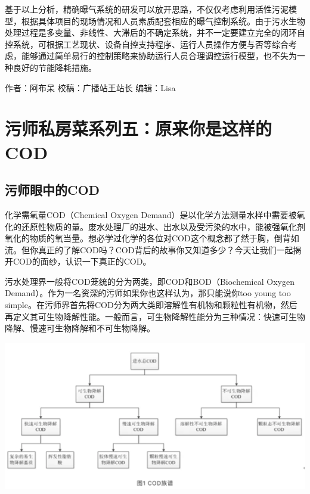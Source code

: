 \documentclass[]{book}
\begin{document}
基于以上分析，精确曝气系统的研发可以放开思路，不仅仅考虑利用活性污泥模型，根据具体项目的现场情况和人员素质配套相应的曝气控制系统。由于污水生物处理过程是多变量、非线性、大滞后的不确定系统，并不一定要建立完全的闭环自控系统，可根据工艺现状、设备自控支持程序、运行人员操作方便与否等综合考虑，能够通过简单易行的控制策略来协助运行人员合理调控运行模型，也不失为一种良好的节能降耗措施。

作者：阿布呆
校稿：广播站王站长
编辑：Lisa

\hypertarget{ux6c61ux5e08ux79c1ux623fux83dcux7cfbux5217ux4e94ux539fux6765ux4f60ux662fux8fd9ux6837ux7684cod}{%
\section{污师私房菜系列五：原来你是这样的COD}\label{ux6c61ux5e08ux79c1ux623fux83dcux7cfbux5217ux4e94ux539fux6765ux4f60ux662fux8fd9ux6837ux7684cod}}

\hypertarget{ux6c61ux5e08ux773cux4e2dux7684cod}{%
\subsection{污师眼中的COD}\label{ux6c61ux5e08ux773cux4e2dux7684cod}}

化学需氧量COD（Chemical Oxygen Demand）是以化学方法测量水样中需要被氧化的还原性物质的量。废水处理厂的进水、出水以及受污染的水中，能被强氧化剂氧化的物质的氧当量。想必学过化学的各位对COD这个概念都了然于胸，倒背如流。但你真正的了解COD吗？COD背后的故事你又知道多少？今天让我们一起揭开COD的面纱，认识一下真正的COD。

污水处理界一般将COD笼统的分为两类，即COD和BOD（Biochemical Oxygen Demand）。作为一名资深的污师如果你也这样认为，那只能说你too young too simple。在污师界首先将COD分为两大类即溶解性有机物和颗粒性有机物，然后再定义其可生物降解性能。一般而言，可生物降解性能分为三种情况：快速可生物降解、慢速可生物降解和不可生物降解。

\includegraphics[width=6.67in]{images/cod1}
\end{document}
